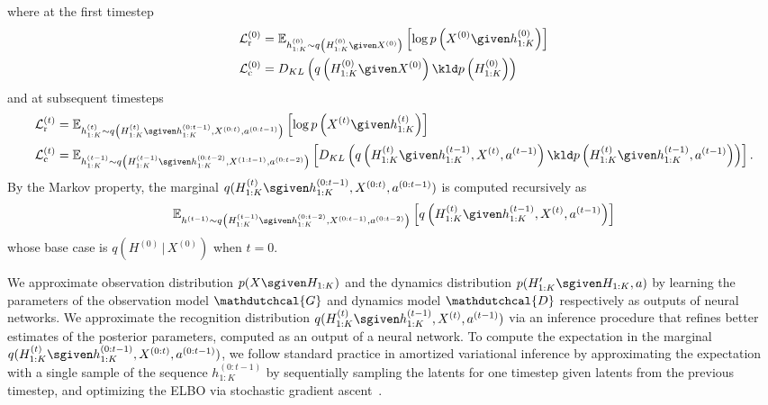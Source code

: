 \normalsize
where at the first timestep
\footnotesize
\begin{align*}
    \mathcal{L}^{(0)}_{\text{r}} &= \mathbb{E}_{h_{1:K}^{(0)} \sim q\left(H_{1:K}^{(0)} \given X^{(0)}\right)}\left[ \log p\left(X^{(0)} \given h_{1:K}^{(0)} \right)\right]\\
     \mathcal{L}^{(0)}_{\text{c}} &= D_{KL}\left(q\left(H_{1:K}^{(0)} \given X^{(0)}\right) \kld p\left(H_{1:K}^{(0)}\right)\right)
\end{align*}
\normalsize
and at subsequent timesteps
\footnotesize
\begin{align*}
    \mathcal{L}^{(t)}_{\text{r}} &= \mathbb{E}_{h^{(t)}_{1:K} \sim q\left(H^{(t)}_{1:K} \sgiven h^{(0:t-1)}_{1:K}, X^{(0:t)}, a^{(0:t-1)} \right)}\left[\log p\left(X^{(t)} \given h^{(t)}_{1:K}\right)\right]\\
    \mathcal{L}^{(t)}_{\text{c}} &= \mathbb{E}_{h^{(t-1)}_{1:K} \sim q\left(H^{(t-1)}_{1:K} \sgiven h^{(0:t-2)}_{1:K}, X^{(1:t-1)}, a^{(0:t-2)} \right)}\left[D_{KL}\left(q\left(H^{(t)}_{1:K} \given h^{(t-1)}_{1:K}, X^{(t)}, a^{(t-1)}\right) \kld p\left(H^{(t)}_{1:K} \given h^{(t-1)}_{1:K}, a^{(t-1)} \right)\right)\right].
\end{align*}
\normalsize
By the Markov property, the marginal $q(H^{(t)}_{1:K} \sgiven h^{(0:t-1)}_{1:K}, X^{(0:t)}, a^{(0:t-1)})$ is computed recursively as
\footnotesize
\begin{equation*}
    \mathbb{E}_{h^{(t-1)} \sim q\left(H^{(t-1)}_{1:K} \sgiven h^{(0:t-2)}_{1:K}, X^{(0:t-1)}, a^{(0:t-2)} \right)}\left[ q\left(H^{(t)}_{1:K} \given h^{(t-1)}_{1:K}, X^{(t)}, a^{(t-1)} \right) \right]
\end{equation*}
\normalsize
whose base case is $q\left(H^{(0)} \,|\, X^{(0)} \right)$ when $t=0$. 

We approximate observation distribution $p(X \sgiven H_{1:K})$ and the dynamics distribution $p(H'_{1:K} \sgiven H_{1:K}, a)$ by learning the parameters of the observation model $\mathdutchcal{G}$ and dynamics model $\mathdutchcal{D}$ respectively as outputs of neural networks.
We approximate the recognition distribution $q(H^{(t)}_{1:K} \sgiven h^{(t-1)}_{1:K}, X^{(t)}, a^{(t-1)})$ via an inference procedure that refines better estimates of the posterior parameters, computed as an output of a neural network.
To compute the expectation in the marginal $q(H^{(t)}_{1:K} \sgiven h^{(0:t-1)}_{1:K}, X^{(0:t)}, a^{(0:t-1)})$, we follow standard practice in amortized variational inference by approximating the expectation with a single sample of the sequence $h^{(0:t-1)}_{1:K}$ by sequentially sampling the latents for one timestep given latents from the previous timestep, and optimizing the ELBO via stochastic gradient ascent~\citep{doersch2016tutorial,kingma2013auto,rezende2014stochastic}.

